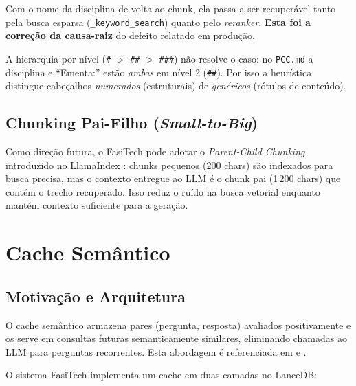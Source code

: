 \documentclass[12pt,a4paper]{report}
\begin{document}
Com o nome da disciplina de volta ao chunk, ela passa a ser recuperável tanto
pela busca esparsa (\texttt{\_keyword\_search}) quanto pelo \textit{reranker}.
\textbf{Esta foi a correção da causa-raiz} do defeito relatado em produção.

\begin{insight}[title=Por que não usar apenas o nível do cabeçalho?]
A hierarquia por nível (\texttt{\#} $>$ \texttt{\#\#} $>$ \texttt{\#\#\#}) não
resolve o caso: no \texttt{PCC.md} a disciplina e ``Ementa:'' estão \emph{ambas}
em nível 2 (\texttt{\#\#}). Por isso a heurística distingue cabeçalhos
\emph{numerados} (estruturais) de \emph{genéricos} (rótulos de conteúdo).
\end{insight}

\subsection{Chunking Pai-Filho (\textit{Small-to-Big})}

Como direção futura, o FasiTech pode adotar o \textit{Parent-Child Chunking}
introduzido no LlamaIndex \autocite{llamaindex2023}: chunks pequenos
(200 chars) são indexados para busca precisa, mas o contexto entregue ao
LLM é o chunk pai (1\,200 chars) que contém o trecho recuperado.
Isso reduz o ruído na busca vetorial enquanto mantém contexto suficiente
para a geração.

\section{Cache Semântico}

\subsection{Motivação e Arquitetura}

O cache semântico armazena pares (pergunta, resposta) avaliados positivamente
e os serve em consultas futuras semanticamente similares, eliminando chamadas
ao LLM para perguntas recorrentes. Esta abordagem é referenciada em
\textcite{bang2023gptcache} e \textcite{zhu2023semsimilaritycache}.

O sistema FasiTech implementa um cache em duas camadas no LanceDB:
\end{document}
